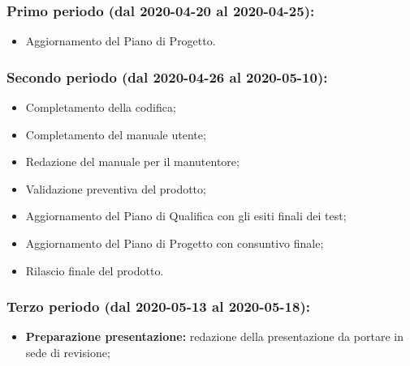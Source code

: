 		\subsubsection{Primo periodo (dal 2020-04-20 al 2020-04-25):}
			\begin{itemize}
			 	\item Aggiornamento del Piano di Progetto.
			\end{itemize} 	
		
		\subsubsection{Secondo periodo (dal 2020-04-26 al 2020-05-10):}
			\begin{itemize}
				\item Completamento della codifica;
				\item Completamento del manuale utente;
				\item Redazione del manuale per il manutentore;
				\item Validazione preventiva del prodotto;
				\item Aggiornamento del Piano di Qualifica con gli esiti finali dei test;
				\item Aggiornamento del Piano di Progetto con consuntivo finale;
				\item Rilascio finale del prodotto.
			\end{itemize}

		\subsubsection{Terzo periodo (dal 2020-05-13 al 2020-05-18):}
			\begin{itemize}
				\item \textbf{Preparazione presentazione:} redazione della presentazione da portare in sede di revisione;
			\end{itemize}

